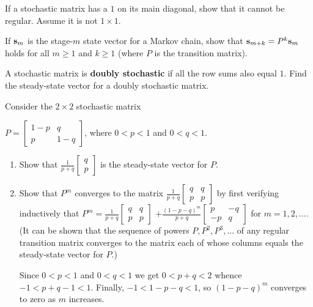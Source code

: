 \documentclass{ximera}
\begin{document}
\begin{problem}\label{prob:stochastic1} 
If a stochastic matrix has a $1$ on its main diagonal, show that it cannot be regular. Assume it is not $1 \times 1$.
\end{problem}

\begin{problem}\label{prob:stage-m}
If ${\bf s}_{m}$ is the stage-$m$ state vector for a Markov chain, show that ${\bf s}_{m+k} = P^{k}{\bf s}_{m}$ holds for all $m \geq 1$ and $k \geq 1$ (where $P$ is the transition matrix).
\end{problem}

\begin{problem}\label{prob:DoublyStochastic1}
A stochastic matrix is \textbf{doubly stochastic} if all the row sums also equal $1$. Find the steady-state vector for a doubly stochastic matrix.
\end{problem}

\begin{problem}\label{prob:stochastic2}
Consider the $2 \times 2$ stochastic matrix

$P = \begin{bmatrix}
1 - p & q \\
p & 1 - q
\end{bmatrix}$, where $0 < p < 1$ and $0 < q < 1$.

\begin{enumerate}
\item Show that $\frac{1}{p + q} \begin{bmatrix}
q \\
p
\end{bmatrix}$
 is the steady-state vector for $P$.

\item Show that $P^{m}$ converges to the matrix $\frac{1}{p + q} \begin{bmatrix}
q & q \\
p & p
\end{bmatrix}$ by first verifying inductively that
$P^m = \frac{1}{p + q} \begin{bmatrix}
q & q \\
p & p
\end{bmatrix}$ $+ \frac{(1 - p - q)^m}{p + q} 
\begin{bmatrix}
p & -q \\
-p & q
\end{bmatrix}$ for $m = 1, 2, \dots$. (It can be shown that the sequence of powers $P, P^{2}, P^{3}, \dots$ of any regular transition matrix converges to the matrix each of whose columns equals the steady-state vector for $P$.)
\begin{hint}
Since $0 < p < 1$ and $0 < q < 1$ we get $0 < p + q < 2$ whence $-1 < p + q - 1 < 1$. Finally, $-1 < 1 - p - q < 1$, so $(1 - p - q)^{m}$ converges to zero as $m$ increases.
\end{hint}
\end{enumerate}
\end{problem}
\end{document}
